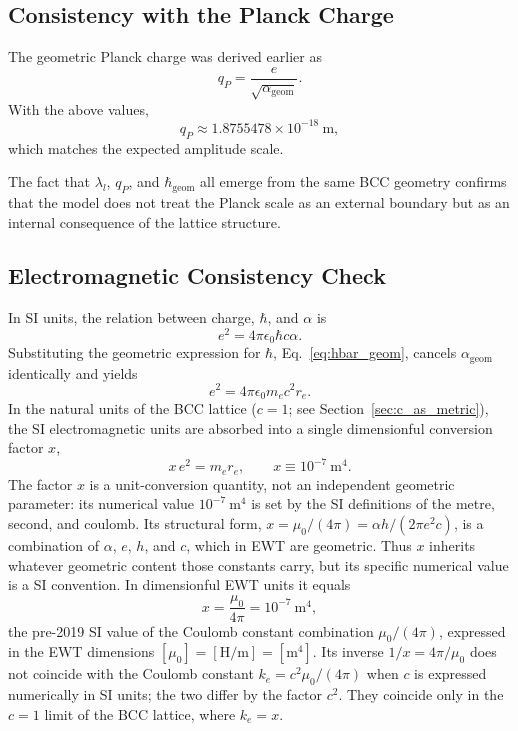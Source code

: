 \documentclass[10pt,a4paper]{article}
\begin{document}
\subsection{Consistency with the Planck Charge}
\label{sec:consistency_qP}

The geometric Planck charge was derived earlier as
\begin{equation}
	q_P = \frac{e}{\sqrt{\alpha_{\text{geom}}}} .
\end{equation}
With the above values,
\begin{equation}
	q_P \approx 1.8755478 \times 10^{-18}\ \text{m},
\end{equation}
which matches the expected amplitude scale.

The fact that \(\lambda_l\), \(q_P\), and \(\hbar_{\text{geom}}\) all emerge from the same BCC geometry confirms that the model does not treat the Planck scale as an external boundary but as an internal consequence of the lattice structure.

\subsection{Electromagnetic Consistency Check}

In SI units, the relation between charge, \(\hbar\), and \(\alpha\) is
\begin{equation}
	e^2 = 4\pi\epsilon_0 \hbar c \alpha .
\end{equation}
Substituting the geometric expression for \(\hbar\), Eq.~\eqref{eq:hbar_geom}, cancels \(\alpha_{\text{geom}}\) identically and yields
\begin{equation}
	e^2 = 4\pi\epsilon_0 m_e c^2 r_e .
	\label{eq:e2_mass_radius}
\end{equation}
In the natural units of the BCC lattice (\(c=1\); see
Section~\ref{sec:c_as_metric}), the SI electromagnetic units are
absorbed into a single dimensionful conversion factor \(x\),
\begin{equation}
	x\, e^2 = m_e r_e ,
	\qquad
	x \equiv 10^{-7}\ \text{m}^4 .
	\label{eq:e2_geometric}
\end{equation}
The factor \(x\) is a unit-conversion quantity, not an independent
geometric parameter: its numerical value \(10^{-7}\ \text{m}^4\) is set
by the SI definitions of the metre, second, and coulomb. Its structural
form, \(x = \mu_0/(4\pi) = \alpha h/(2\pi e^2 c)\), is a combination of
\(\alpha\), \(e\), \(h\), and \(c\), which in EWT are geometric. Thus
\(x\) inherits whatever geometric content those constants carry, but
its specific numerical value is a SI convention. In dimensionful EWT units it equals
\begin{equation}
	x = \frac{\mu_0}{4\pi} = 10^{-7}\ \text{m}^4 ,
\end{equation}
the pre-2019 SI value of the Coulomb constant combination
\(\mu_0/(4\pi)\), expressed in the EWT dimensions
\([\mu_0] = [\text{H/m}] = [\text{m}^4]\). Its inverse
\(1/x = 4\pi/\mu_0\) does not coincide with the Coulomb constant
\(k_e = c^{2}\mu_0/(4\pi)\) when \(c\) is expressed numerically in SI
units; the two differ by the factor \(c^{2}\). They coincide only in
the \(c=1\) limit of the BCC lattice, where \(k_e = x\).
\end{document}
